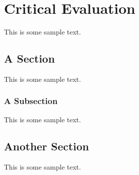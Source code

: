 \chapter{Critical Evaluation}

This is some sample text.

\section{A Section}

This is some sample text.

\subsection{A Subsection}

This is some sample text.

\section{Another Section}

This is some sample text.
